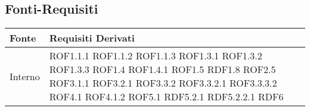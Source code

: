 \subsection{Fonti-Requisiti} %
\label{sub:fonti_requisiti}

\begin{center}

\def\arraystretch{1.5}
\bgroup
\begin{longtable}{| p{4cm} | p{4cm} |}

	\hline
	\textbf{Fonte} & \textbf{Requisiti Derivati} \\
	\hline

	Interno  &  ROF1.1.1 \newline ROF1.1.2 \newline ROF1.1.3 \newline ROF1.3.1 \newline ROF1.3.2 \newline ROF1.3.3 \newline ROF1.4 \newline ROF1.4.1 \newline ROF1.5 \newline RDF1.8 \newline ROF2.5 \newline ROF3.1.1 \newline ROF3.2.1 \newline ROF3.3.2 \newline ROF3.3.2.1 \newline ROF3.3.3.2 \newline ROF4.1 \newline ROF4.1.2 \newline ROF5.1 \newline RDF5.2.1 \newline RDF5.2.2.1 \newline RDF6 \newli
\end{longtable}
\end{center}
